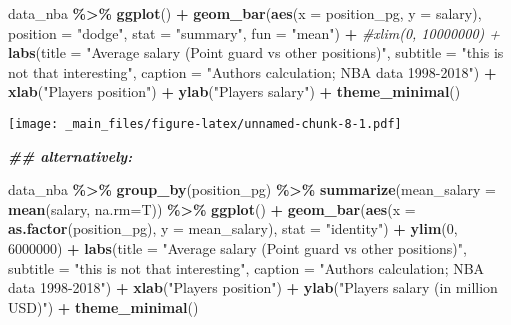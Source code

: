 \documentclass[
]{book}
\newenvironment{Shaded}{\begin{snugshade}}{\end{snugshade}}
\newcommand{\AttributeTok}[1]{\textcolor[rgb]{0.13,0.29,0.53}{#1}}
\newcommand{\CommentTok}[1]{\textcolor[rgb]{0.56,0.35,0.01}{\textit{#1}}}
\newcommand{\DecValTok}[1]{\textcolor[rgb]{0.00,0.00,0.81}{#1}}
\newcommand{\DocumentationTok}[1]{\textcolor[rgb]{0.56,0.35,0.01}{\textbf{\textit{#1}}}}
\newcommand{\FunctionTok}[1]{\textcolor[rgb]{0.13,0.29,0.53}{\textbf{#1}}}
\newcommand{\NormalTok}[1]{#1}
\newcommand{\SpecialCharTok}[1]{\textcolor[rgb]{0.81,0.36,0.00}{\textbf{#1}}}
\newcommand{\StringTok}[1]{\textcolor[rgb]{0.31,0.60,0.02}{#1}}
\begin{document}
\begin{Shaded}
\begin{Highlighting}[]
\NormalTok{data\_nba }\SpecialCharTok{\%\textgreater{}\%} 
  \FunctionTok{ggplot}\NormalTok{() }\SpecialCharTok{+}
  \FunctionTok{geom\_bar}\NormalTok{(}\FunctionTok{aes}\NormalTok{(}\AttributeTok{x =}\NormalTok{ position\_pg, }
               \AttributeTok{y =}\NormalTok{ salary),}
           \AttributeTok{position =} \StringTok{"dodge"}\NormalTok{,}
           \AttributeTok{stat =} \StringTok{"summary"}\NormalTok{,}
           \AttributeTok{fun =} \StringTok{"mean"}\NormalTok{) }\SpecialCharTok{+} 
  \CommentTok{\#xlim(0, 10000000) +}
  \FunctionTok{labs}\NormalTok{(}\AttributeTok{title =} \StringTok{"Average salary (Point guard vs other positions)"}\NormalTok{,}
       \AttributeTok{subtitle =} \StringTok{"this is not that interesting"}\NormalTok{,}
       \AttributeTok{caption =} \StringTok{"Authors\textquotesingle{} calculation; NBA data 1998{-}2018"}\NormalTok{) }\SpecialCharTok{+}
  \FunctionTok{xlab}\NormalTok{(}\StringTok{"Player\textquotesingle{}s position"}\NormalTok{) }\SpecialCharTok{+}
  \FunctionTok{ylab}\NormalTok{(}\StringTok{"Player\textquotesingle{}s salary"}\NormalTok{) }\SpecialCharTok{+}
  \FunctionTok{theme\_minimal}\NormalTok{()}
\end{Highlighting}
\end{Shaded}

\texttt{[image: \_main\_files/figure-latex/unnamed-chunk-8-1.pdf]}

\begin{Shaded}
\begin{Highlighting}[]
\DocumentationTok{\#\# alternatively:}

\NormalTok{data\_nba }\SpecialCharTok{\%\textgreater{}\%} 
  \FunctionTok{group\_by}\NormalTok{(position\_pg) }\SpecialCharTok{\%\textgreater{}\%}
  \FunctionTok{summarize}\NormalTok{(}\AttributeTok{mean\_salary =} \FunctionTok{mean}\NormalTok{(salary, }\AttributeTok{na.rm=}\NormalTok{T)) }\SpecialCharTok{\%\textgreater{}\%}
  \FunctionTok{ggplot}\NormalTok{() }\SpecialCharTok{+}
  \FunctionTok{geom\_bar}\NormalTok{(}\FunctionTok{aes}\NormalTok{(}\AttributeTok{x =} \FunctionTok{as.factor}\NormalTok{(position\_pg), }
               \AttributeTok{y =}\NormalTok{ mean\_salary),}
           \AttributeTok{stat =} \StringTok{"identity"}\NormalTok{) }\SpecialCharTok{+} 
  \FunctionTok{ylim}\NormalTok{(}\DecValTok{0}\NormalTok{, }\DecValTok{6000000}\NormalTok{) }\SpecialCharTok{+}
  \FunctionTok{labs}\NormalTok{(}\AttributeTok{title =} \StringTok{"Average salary (Point guard vs other positions)"}\NormalTok{,}
       \AttributeTok{subtitle =} \StringTok{"this is not that interesting"}\NormalTok{,}
       \AttributeTok{caption =} \StringTok{"Authors\textquotesingle{} calculation; NBA data 1998{-}2018"}\NormalTok{) }\SpecialCharTok{+}
  \FunctionTok{xlab}\NormalTok{(}\StringTok{"Player\textquotesingle{}s position"}\NormalTok{) }\SpecialCharTok{+}
  \FunctionTok{ylab}\NormalTok{(}\StringTok{"Player\textquotesingle{}s salary (in million USD)"}\NormalTok{) }\SpecialCharTok{+}
  \FunctionTok{theme\_minimal}\NormalTok{()}
\end{Highlighting}
\end{Shaded}
\end{document}
